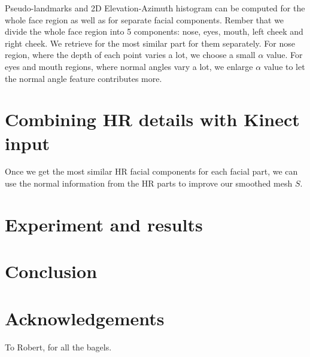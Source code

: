 \documentclass[annual]{acmsiggraph}
\begin{document}
Pseudo-landmarks and 2D Elevation-Azimuth histogram can be computed for the whole face region as well as for separate facial components. Rember that we divide the whole face region into 5 components: nose, eyes, mouth, left cheek and right cheek. We retrieve for the most similar part for them separately. For nose region, where the depth of each point varies a lot, we choose a small $\alpha$ value. For eyes and mouth regions, where normal angles vary a lot, we enlarge $\alpha$ value to let the normal angle feature contributes more.
 
\section{Combining HR details with Kinect input}
Once we get the most similar HR facial components for each facial part, we can use the normal information from the HR parts to improve our smoothed mesh $S$. 

\section{Experiment and results}



\section{Conclusion}


\section*{Acknowledgements}

To Robert, for all the bagels.



\end{document}
